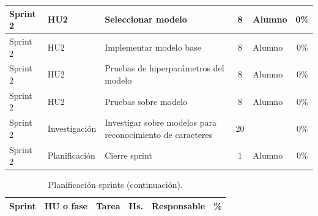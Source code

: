 \documentclass[
11pt, %
]{charter}
\begin{document}
\begin{table}[htpb]
\begin{tabularx}{\linewidth}{@{}|l|l|X|c|l|c|@{}}
Sprint 2	&	HU2	&	Seleccionar modelo	&	8	&	Alumno	&	0\%	\\ \hline
Sprint 2	&	HU2	&	Implementar modelo base	&	8	&	Alumno	&	0\%	\\ \hline
Sprint 2	&	HU2	&	Pruebas de hiperparámetros del modelo	&	8	&	Alumno	&	0\%	\\ \hline
Sprint 2	&	HU2	&	Pruebas sobre modelo	&	8	&	Alumno	&	0\%	\\ \hline
Sprint 2	&	Investigación	&	Investigar sobre modelos para reconocimiento de caracteres	&	20	&		&	0\%	\\ \hline
Sprint 2	&	Planificación	&	Cierre sprint	&	1	&	Alumno	&	0\%	\\ \hline

\end{tabularx}
\end{table}
\begin{table}[htpb]
\centering
\caption{Planificación sprints (continuación).}
\begin{tabularx}{\linewidth}{@{}|l|l|X|c|l|c|@{}}
\hline
\rowcolor[HTML]{C0C0C0}
Sprint	&	HU o fase	&	Tarea	&	Hs.	&	Responsable	&	\%	\\ \hline


\end{tabularx}
\end{table}
\end{document}
